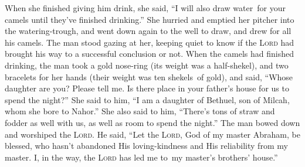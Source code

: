 \begin{inparaenum}
     When she finished giving him drink, she said, ``I will also draw water\understood\ for your camels until they've finished drinking.''%
     She hurried and emptied her pitcher into the watering-trough, and went down again to the well to draw, and drew for all his camels.%
     The man stood gazing at her, keeping quiet to know if the \textsc{Lord} had brought his way to a successful conclusion or not.%
     When the camels had finished drinking, the man took a gold nose-ring (its weight was a half-shekel), and two bracelets for her hands (their weight was ten shekels\understood\ of gold),%
     and said, ``Whose daughter are you? Please tell me. Is there place in your father's house for us to spend the night?''%
     She said to him, ``I am a daughter of Bethuel, son of Milcah, whom she bore to Nahor.''%
     She also said to him, ``There's tons of straw and fodder as well with us, as well as room to spend the night.''%
     The man bowed down and worshiped the \textsc{Lord}.%
     He said, ``Let the \textsc{Lord}, God of my master Abraham, be blessed, who hasn't abandoned His loving-kindness and His reliability from my master. I, in the way, the \textsc{Lord} has led me to\understood\ my master's brothers' house.''%
    

\end{inparaenum}
